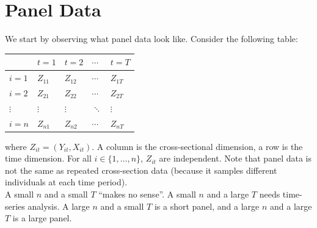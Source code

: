 \section{Panel Data}
We start by observing what panel data look like. Consider the following table:
\begin{center}
    \begin{tabular}{|l|l|l|l|l|}
    \hline
    & $t=1$ & $t=2$ & $\cdots$ & $t=T$ \\ \hline
    $i=1$ & $Z_{11}$ & $Z_{12}$ & $\cdots$ & $Z_{1T}$ \\ \hline
    $i=2$ & $Z_{21}$ & $Z_{22}$ & $\cdots$ & $Z_{2T}$ \\ \hline
    $\vdots$ & $\vdots$ & $\vdots$ & $\ddots$ & $\vdots$ \\ \hline
    $i=n$ & $Z_{n1}$ & $Z_{n2}$ & $\cdots$ & $Z_{nT}$ \\ \hline
    \end{tabular}
\end{center}
where $Z_{it} = (Y_{it}, X_{it})$. A column is the cross-sectional dimension, a row is the time dimension. For all $i \in \{1, \dots, n\}$, $Z_{it}$ are independent. Note that panel data is not the same as repeated cross-section data (because it samples different individuals at each time period). \\
A small $n$ and a small $T$ ``makes no sense''. A small $n$ and a large $T$ needs time-series analysis. A large $n$ and a small $T$ is a short panel, and a large $n$ and a large $T$ is a large panel.

